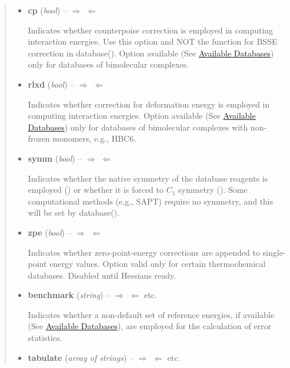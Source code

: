 \documentclass[letterpaper,10pt,english]{sphinxmanual}
\begin{document}
\begin{fulllineitems}
\begin{quote}
\begin{description}
\begin{itemize}
\item {} 
\textbf{cp} (\emph{bool}) -- 
 \textbar{}\textbar{} $\Rightarrow$  $\Leftarrow$

Indicates whether counterpoise correction is employed in computing
interaction energies. Use this option and NOT the {\hyperref[index:wrappers.cp]{}}
function for BSSE correction in database().  Option available
(See {\hyperref[index:available-databases]{Available Databases}}) only for databases of bimolecular complexes.


\item {} 
\textbf{rlxd} (\emph{bool}) -- 
 \textbar{}\textbar{} $\Rightarrow$  $\Leftarrow$

Indicates whether correction for deformation energy is
employed in computing interaction energies.  Option available
(See {\hyperref[index:available-databases]{Available Databases}}) only for databases of bimolecular complexes 
with non-frozen monomers, e.g., HBC6.


\item {} 
\textbf{symm} (\emph{bool}) -- 
$\Rightarrow$  $\Leftarrow$ \textbar{}\textbar{} 

Indicates whether the native symmetry of the database reagents is
employed () or whether it is forced to $C_1$ symmetry
(). Some computational methods (e.g., SAPT) require no
symmetry, and this will be set by database().


\item {} 
\textbf{zpe} (\emph{bool}) -- 
 \textbar{}\textbar{} $\Rightarrow$  $\Leftarrow$

Indicates whether zero-point-energy corrections are appended to
single-point energy values. Option valid only for certain
thermochemical databases. Disabled until Hessians ready.


\item {} 
\textbf{benchmark} (\emph{string}) -- 
$\Rightarrow$  $\Leftarrow$ \textbar{}\textbar{}  \textbar{}\textbar{} etc.

Indicates whether a non-default set of reference energies, if
available (See {\hyperref[index:available-databases]{Available Databases}}), are employed for the
calculation of error statistics.


\item {} 
\textbf{tabulate} (\emph{array of strings}) -- 
$\Rightarrow$ \code{{[}{]}} $\Leftarrow$ \textbar{}\textbar{}  \textbar{}\textbar{} etc.


\end{itemize}
\end{description}
\end{quote}
\end{fulllineitems}
\end{document}
